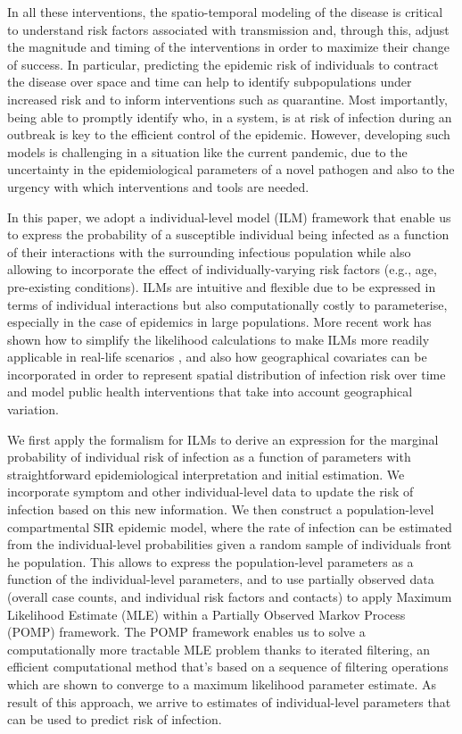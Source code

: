 \documentclass{article}
\begin{document}
In all these interventions, the spatio-temporal modeling of the disease is critical to understand risk factors associated with transmission and, through this, adjust the magnitude and timing of the interventions in order to maximize their change of success. In particular, predicting the epidemic risk of individuals to contract the disease over space and time can help to identify subpopulations under increased risk and to inform interventions such as quarantine. Most importantly, being able to promptly identify who, in a system, is at risk of infection during an outbreak is key to the efficient control of the epidemic. However, developing such models is challenging in a situation like the current pandemic, due to the uncertainty in the epidemiological parameters of a novel pathogen and also to the urgency with which interventions and tools are needed.

In this paper, we adopt a individual-level model (ILM) framework that enable us to express the probability of a susceptible individual being infected as a function of their interactions with the surrounding infectious population while also allowing to incorporate the effect of individually-varying risk factors (e.g., age, pre-existing conditions). ILMs are intuitive and flexible due to be expressed in terms of individual interactions \cite{Gibson1997, Keeling2001, Neal2004} but also computationally costly to parameterise, especially in the case of epidemics in large populations. More recent work has shown how to simplify the likelihood calculations to make ILMs more readily applicable in real-life scenarios \cite{Deardon2010}, and also how geographical covariates can be incorporated \cite{Mahsin2020} in order to represent spatial distribution of infection risk over time and model public health interventions that take into account geographical variation.
 
We first apply the formalism for ILMs to derive an expression for the marginal probability of individual risk of infection as a function of parameters with straightforward epidemiological interpretation and initial estimation. We incorporate symptom and other individual-level data to update the risk of infection based on this new information. We then construct a population-level compartmental SIR epidemic model, where the rate of infection can be estimated from the individual-level probabilities given a random sample of individuals front he population. This allows to express the population-level parameters as a function of the individual-level parameters, and to use partially observed data (overall case counts, and individual risk factors and contacts) to apply Maximum Likelihood Estimate (MLE) within a Partially Observed Markov Process (POMP) framework. The POMP framework enables us to solve a computationally more tractable MLE problem thanks to iterated filtering, an efficient computational method that's based on a sequence of filtering operations which are shown to converge to a maximum likelihood parameter estimate. As result of this approach, we arrive to estimates of individual-level parameters that can be used to predict risk of infection.
\end{document}
